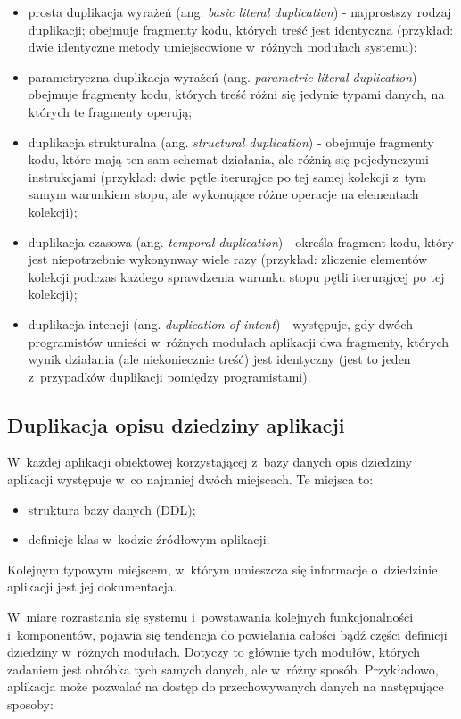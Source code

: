 \begin{itemize}
 \item prosta duplikacja wyrażeń (ang. \emph{basic literal duplication}) - najprostszy rodzaj duplikacji; obejmuje fragmenty kodu, których treść jest identyczna (przykład: dwie identyczne metody umiejscowione w~różnych modułach systemu);
 \item parametryczna duplikacja wyrażeń (ang. \emph{parametric literal duplication}) - obejmuje fragmenty kodu, których treść różni się jedynie typami danych, na których te fragmenty operują;
 \item duplikacja strukturalna (ang. \emph{structural duplication}) - obejmuje fragmenty kodu, które mają ten sam schemat działania, ale różnią się pojedynczymi instrukcjami (przykład: dwie pętle iterurąjce po tej samej kolekcji z~tym samym warunkiem stopu, ale wykonujące różne operacje na elementach kolekcji);
 \item duplikacja czasowa (ang. \emph{temporal duplication}) - określa fragment kodu, który jest niepotrzebnie wykonynway wiele razy (przykład: zliczenie elementów kolekcji podczas każdego sprawdzenia warunku stopu pętli iterurąjcej po tej kolekcji);
 \item duplikacja intencji (ang. \emph{duplication of intent}) - występuje, gdy dwóch programistów umieści w~różnych modułach aplikacji dwa fragmenty, których wynik działania (ale niekoniecznie treść) jest identyczny (jest to jeden z~przypadków duplikacji pomiędzy programistami).
\end{itemize}


\subsection{Duplikacja opisu dziedziny aplikacji}

W~każdej aplikacji obiektowej korzystającej z~bazy danych opis dziedziny aplikacji występuje w~co najmniej dwóch miejscach.
Te miejsca to:

\begin{itemize}
 \item struktura bazy danych (DDL);
 \item definicje klas w~kodzie źródłowym aplikacji.
\end{itemize}

Kolejnym typowym miejscem, w~którym umieszcza się informacje o~dziedzinie aplikacji jest jej dokumentacja.

W~miarę rozrastania się systemu i~powstawania kolejnych funkcjonalności i~komponentów, pojawia się tendencja do powielania całości bądź części definicji dziedziny w~różnych modułach.
Dotyczy to głównie tych modułów, których zadaniem jest obróbka tych samych danych, ale w~różny sposób.
Przykładowo, aplikacja może pozwalać na dostęp do przechowywanych danych na następujące sposoby:


